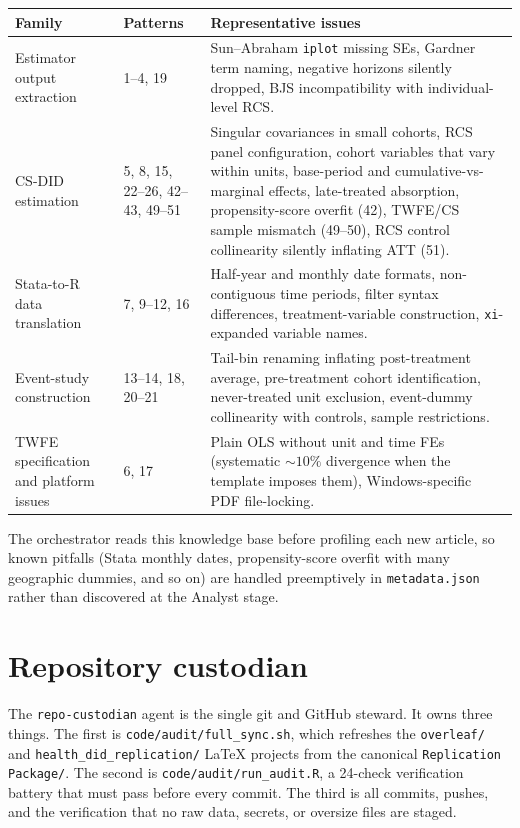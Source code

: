 \begin{table}[H]
\centering
\footnotesize
\begin{tabularx}{\textwidth}{@{}l l X@{}}
\toprule
\textbf{Family} & \textbf{Patterns} & \textbf{Representative issues} \\
\midrule
Estimator output extraction            & 1--4, 19           & Sun--Abraham \texttt{iplot} missing SEs, Gardner term naming, negative horizons silently dropped, BJS incompatibility with individual-level RCS. \\
CS-DID estimation                      & 5, 8, 15, 22--26, 42--43, 49--51 & Singular covariances in small cohorts, RCS panel configuration, cohort variables that vary within units, base-period and cumulative-vs-marginal effects, late-treated absorption, propensity-score overfit (42), TWFE/CS sample mismatch (49--50), RCS control collinearity silently inflating ATT (51). \\
Stata-to-R data translation            & 7, 9--12, 16       & Half-year and monthly date formats, non-contiguous time periods, filter syntax differences, treatment-variable construction, \texttt{xi}-expanded variable names. \\
Event-study construction               & 13--14, 18, 20--21 & Tail-bin renaming inflating post-treatment average, pre-treatment cohort identification, never-treated unit exclusion, event-dummy collinearity with controls, sample restrictions. \\
TWFE specification and platform issues & 6, 17              & Plain OLS without unit and time FEs (systematic ${\sim}10\%$ divergence when the template imposes them), Windows-specific PDF file-locking. \\
\bottomrule
\end{tabularx}
\end{table}

The orchestrator reads this knowledge base before profiling each new article, so known pitfalls (Stata monthly dates, propensity-score overfit with many geographic dummies, and so on) are handled preemptively in \texttt{metadata.json} rather than discovered at the Analyst stage.


\section{Repository custodian}
\label{sec:appc_custodian}

The \texttt{repo-custodian} agent is the single git and GitHub steward. It owns three things. The first is \texttt{code/audit/full\_sync.sh}, which refreshes the \texttt{overleaf/} and \texttt{health\_did\_replication/} LaTeX projects from the canonical \texttt{Replication Package/}. The second is \texttt{code/audit/run\_audit.R}, a 24-check verification battery that must pass before every commit. The third is all commits, pushes, and the verification that no raw data, secrets, or oversize files are staged.

